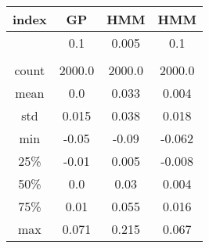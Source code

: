 \centering \begin{tabular}{c|c|c|c}
index	&GP	&HMM	&HMM\\\hline
	&0.1	&0.005	&0.1\\
	&	&	&\\
count	&2000.0	&2000.0	&2000.0\\
mean	&0.0	&0.033	&0.004\\
std	&0.015	&0.038	&0.018\\
min	&-0.05	&-0.09	&-0.062\\
25\%	&-0.01	&0.005	&-0.008\\
50\%	&0.0	&0.03	&0.004\\
75\%	&0.01	&0.055	&0.016\\
max	&0.071	&0.215	&0.067\\
\end{tabular}
